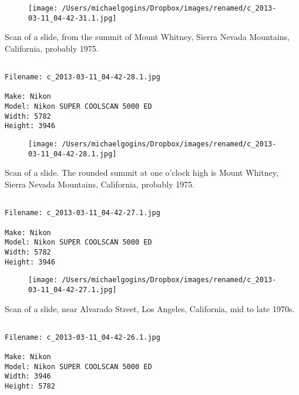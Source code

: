 \begin{figure}
\texttt{[image: /Users/michaelgogins/Dropbox/images/renamed/c\_2013-03-11\_04-42-31.1.jpg]}
\end{figure}
    
\clearpage
\onecolumn
\noindent Scan of a slide, from the summit of Mount Whitney, Sierra Nevada Mountains, California, probably 1975.
\noindent
\begin{lstlisting}

Filename: c_2013-03-11_04-42-28.1.jpg

Make: Nikon
Model: Nikon SUPER COOLSCAN 5000 ED
Width: 5782
Height: 3946
\end{lstlisting}
\clearpage

\begin{figure}
\texttt{[image: /Users/michaelgogins/Dropbox/images/renamed/c\_2013-03-11\_04-42-28.1.jpg]}
\end{figure}
    
\clearpage
\onecolumn
\noindent Scan of a slide. The rounded summit at one o'clock high is Mount Whitney, Sierra Nevada Mountains, California, probably 1975.
\noindent
\begin{lstlisting}

Filename: c_2013-03-11_04-42-27.1.jpg

Make: Nikon
Model: Nikon SUPER COOLSCAN 5000 ED
Width: 5782
Height: 3946
\end{lstlisting}
\clearpage

\begin{figure}
\texttt{[image: /Users/michaelgogins/Dropbox/images/renamed/c\_2013-03-11\_04-42-27.1.jpg]}
\end{figure}
    
\clearpage
\onecolumn
\noindent Scan of a slide, near Alvarado Street, Los Angeles, California, mid to late 1970s.
\noindent
\begin{lstlisting}

Filename: c_2013-03-11_04-42-26.1.jpg

Make: Nikon
Model: Nikon SUPER COOLSCAN 5000 ED
Width: 3946
Height: 5782
\end{lstlisting}
\clearpage

